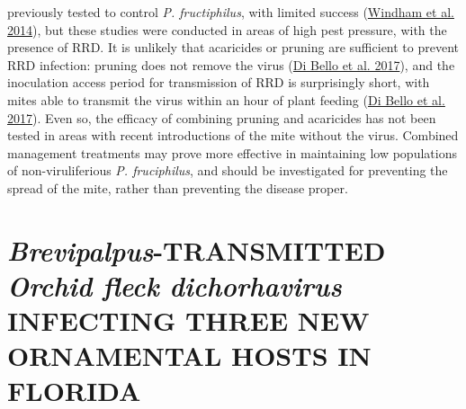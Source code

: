 \documentclass{ufdissertation}[overrideChapters] %
\begin{document}
{previously tested to control \emph{P. fructiphilus}, with limited success (\protect\hyperlink{ref-Windham2014}{Windham et al. 2014}), but these studies were conducted in areas of high pest pressure, with the presence of RRD. It is unlikely that acaricides or pruning are sufficient to prevent RRD infection: pruning does not remove the virus (\protect\hyperlink{ref-Bello2017}{Di Bello et al. 2017}), and the inoculation access period for transmission of RRD is surprisingly short, with mites able to transmit the virus within an hour of plant feeding (\protect\hyperlink{ref-Bello2017}{Di Bello et al. 2017}). Even so, the efficacy of combining pruning and acaricides has not been tested in areas with recent introductions of the mite without the virus. Combined management treatments may prove more effective in maintaining low populations of non-viruliferious \emph{P. fruciphilus}, and should be investigated for preventing the spread of the mite, rather than preventing the disease proper.

\hypertarget{brevipalpus-transmitted-orchid-fleck-dichorhavirus-infecting-three-new-ornamental-hosts-in-florida}{%
\chapter{\texorpdfstring{\emph{Brevipalpus}-TRANSMITTED \emph{Orchid fleck dichorhavirus} INFECTING THREE NEW ORNAMENTAL HOSTS IN FLORIDA}{Brevipalpus-TRANSMITTED Orchid fleck dichorhavirus INFECTING THREE NEW ORNAMENTAL HOSTS IN FLORIDA}}\label{brevipalpus-transmitted-orchid-fleck-dichorhavirus-infecting-three-new-ornamental-hosts-in-florida}}

}
\end{document}

